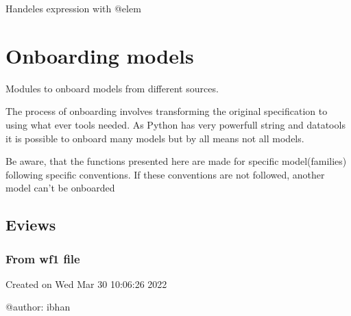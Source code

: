 \documentclass[letterpaper,10pt,english]{sphinxmanual}
\begin{document}
\begin{fulllineitems}
\label{\detokenize{index:modelnormalize.elem_trans}}
\pysigstartsignatures
{}
\pysigstopsignatures
\sphinxAtStartPar
Handeles expression with @elem

\end{fulllineitems}



\section{Onboarding models}
\label{\detokenize{index:onboarding-models}}
\sphinxAtStartPar
Modules to onboard models from different sources.

\sphinxAtStartPar
The process of onboarding involves transforming the original specification
to  using what ever tools needed. As Python has very
powerfull string and datatools it is possible to onboard many models \sphinxhyphen{} but by all means not all models.

\sphinxAtStartPar
Be aware, that the functions presented here are made for specific model(families) following specific conventions. If these
conventions are not followed, another model can’t be onboarded


\subsection{Eviews}
\label{\detokenize{index:eviews}}

\subsubsection{From wf1 file}
\label{\detokenize{index:module-modelgrabwf2}}\label{\detokenize{index:from-wf1-file}}
\sphinxAtStartPar
Created on Wed Mar 30 10:06:26 2022

\sphinxAtStartPar
@author: ibhan
\end{document}
